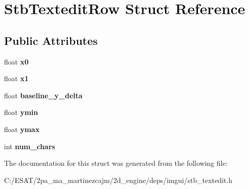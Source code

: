 \hypertarget{struct_stb_textedit_row}{}\section{Stb\+Textedit\+Row Struct Reference}
\label{struct_stb_textedit_row}
\subsection*{Public Attributes}
\begin{DoxyCompactItemize}
\item 
\mbox{\label{struct_stb_textedit_row_af30b3e1d61d1acea26d3e0ebec2cb81d}} 
float {\bfseries x0}
\item 
\mbox{\label{struct_stb_textedit_row_a3a3e1a506030c871a1b3d09bf26e341f}} 
float {\bfseries x1}
\item 
\mbox{\label{struct_stb_textedit_row_ad2d72b74b1a61e331949c7f7ec311880}} 
float {\bfseries baseline\+\_\+y\+\_\+delta}
\item 
\mbox{\label{struct_stb_textedit_row_a707d331bd9dc99d64c81f71106b75eed}} 
float {\bfseries ymin}
\item 
\mbox{\label{struct_stb_textedit_row_aab290e15f6a3b4a96ab2c2472cc8a7a5}} 
float {\bfseries ymax}
\item 
\mbox{\label{struct_stb_textedit_row_a1a19bebadb3f82b4f86ea29698d77084}} 
int {\bfseries num\+\_\+chars}
\end{DoxyCompactItemize}


The documentation for this struct was generated from the following file\+:\begin{DoxyCompactItemize}
\item 
C\+:/\+E\+S\+A\+T/2pa\+\_\+ma\+\_\+martinezcajm/2d\+\_\+engine/deps/imgui/stb\+\_\+textedit.\+h\end{DoxyCompactItemize}
